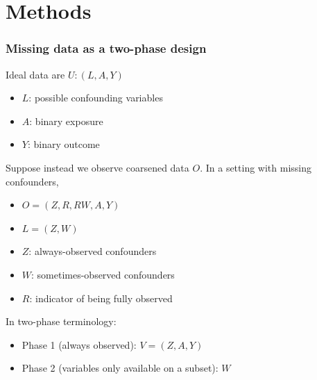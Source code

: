 \documentclass[10pt, table]{beamer}
\begin{document}
\section{Methods}
\begin{frame} \frametitle{Missing data as a two-phase design}
  Ideal data are $U : (L,A,Y)$\vspace{-0.4cm}
  \begin{itemize}
    \item $L$: possible confounding variables
    \item $A$: binary exposure
    \item $Y$: binary outcome
  \end{itemize} \vspace{-0.2cm} \pause

  Suppose instead we observe coarsened data $O$. In a setting with missing confounders, \vspace{-0.4cm}
  \begin{itemize}
    \item $O = (Z,R,R W,A,Y)$
    \item $L = (Z,W)$
    \item $Z$: always-observed confounders
    \item $W$: sometimes-observed confounders
    \item $R$: indicator of being fully observed
  \end{itemize} \pause 

  In two-phase terminology: \vspace{-0.4cm}
  \begin{itemize}
    \item Phase 1 (always observed): $V = (Z,A,Y)$
    \item Phase 2 (variables only available on a subset): $W$
  \end{itemize}
  
\end{frame}
\end{document}

